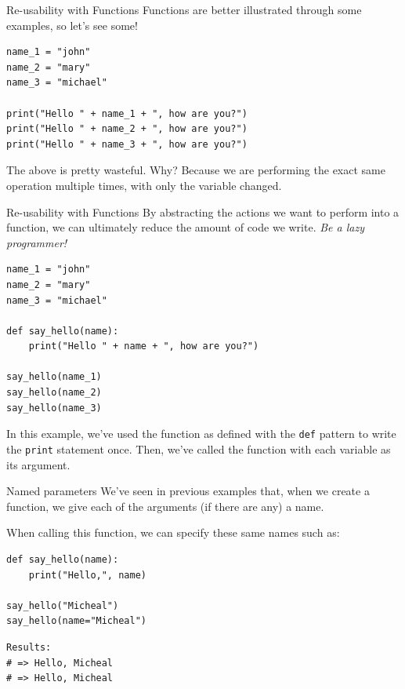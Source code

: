 \documentclass[10pt]{beamer}
\begin{document}
\begin{frame}[label={sec:org8982b8d},fragile]{Re-usability with Functions}
 Functions are better illustrated through some examples, so let's see some!

\begin{verbatim}
name_1 = "john"
name_2 = "mary"
name_3 = "michael"

print("Hello " + name_1 + ", how are you?")
print("Hello " + name_2 + ", how are you?")
print("Hello " + name_3 + ", how are you?")
\end{verbatim}

The above is pretty wasteful. Why? Because we are performing the exact same
operation multiple times, with only the variable changed.
\end{frame}

\begin{frame}[label={sec:orgad787c9},fragile]{Re-usability with Functions}
 By abstracting the actions we want to perform into a function, we can ultimately
reduce the amount of code we write. \emph{Be a lazy programmer!}

\begin{verbatim}
name_1 = "john"
name_2 = "mary"
name_3 = "michael"

def say_hello(name):
    print("Hello " + name + ", how are you?")

say_hello(name_1)
say_hello(name_2)
say_hello(name_3)
\end{verbatim}

In this example, we've used the function as defined with the \texttt{def} pattern to write
the \texttt{print} statement once. Then, we've called the function with each variable as its
argument.
\end{frame}

\begin{frame}[label={sec:org94fc565},fragile]{Named parameters}
 We've seen in previous examples that, when we create a function, we give each of the
arguments (if there are any) a name.

When calling this function, we can specify these same names such as:

\begin{verbatim}
def say_hello(name):
    print("Hello,", name)

say_hello("Micheal")
say_hello(name="Micheal")
\end{verbatim}

\begin{verbatim}
Results: 
# => Hello, Micheal
# => Hello, Micheal
\end{verbatim}
\end{frame}
\end{document}
